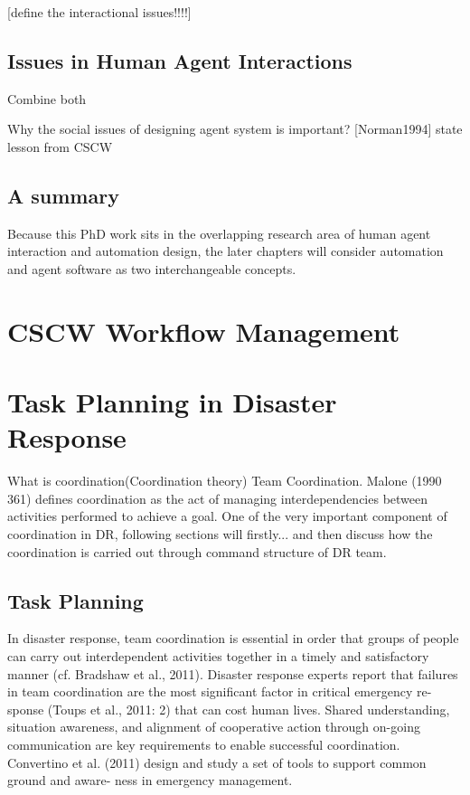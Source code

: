 [define the interactional issues!!!!]




\subsection{ Issues in Human Agent Interactions }
Combine both 

Why the social issues of designing agent system is important? [Norman1994]
state lesson from CSCW



\subsection{A summary}

Because this PhD work sits in the overlapping research area of human agent interaction and automation design, the later chapters will consider automation and agent software as two interchangeable concepts.


\section{CSCW Workflow Management}


\section{Task Planning in Disaster Response}\label{ch:teams}

What is coordination(Coordination theory) Team Coordination. Malone (1990 361) defines coordination as the act of managing interdependencies between activities performed to achieve a goal. One of the very important component of coordination in DR, following sections will firstly... and then discuss how the coordination is carried out through command structure of DR team. 

\subsection{Task Planning}
In disaster response, team coordination is essential in order that groups of people can carry out interdependent activities together in a timely and satisfactory manner (cf. Bradshaw et al., 2011). Disaster response experts report that failures in team coordination are the most significant factor in critical emergency re- sponse (Toups et al., 2011: 2) that can cost human lives. Shared understanding, situation awareness, and alignment of cooperative action through on-going communication are key requirements to enable successful coordination. Convertino et al. (2011) design and study a set of tools to support common ground and aware- ness in emergency management. \\

